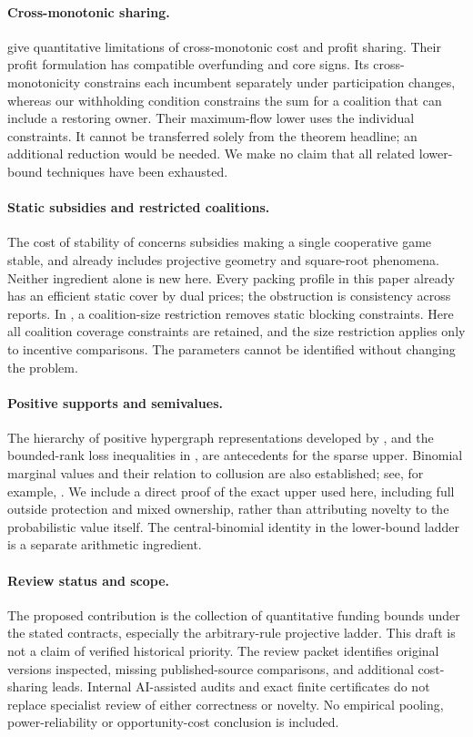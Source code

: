 \documentclass[11pt]{article}
\theoremstyle{definition}\newtheorem{definition}[theorem]{Definition}
\theoremstyle{remark}\newtheorem{remark}[theorem]{Remark}
\begin{document}
\paragraph{Cross-monotonic sharing.}
\citet{ImmorlicaEtAl2008} give quantitative limitations of cross-monotonic
cost and profit sharing. Their profit formulation has compatible overfunding
and core signs. Its cross-monotonicity constrains each incumbent separately
under participation changes, whereas our withholding condition constrains the
sum for a coalition that can include a restoring owner. Their maximum-flow
lower uses the individual constraints. It cannot be transferred solely from
the theorem headline; an additional reduction would be needed. We make no
claim that all related lower-bound techniques have been exhausted.

\paragraph{Static subsidies and restricted coalitions.}
The cost of stability of \citet{BachrachEtAl2009} concerns subsidies making a
single cooperative game stable, and already includes projective geometry and
square-root phenomena. Neither ingredient alone is new here. Every packing
profile in this paper already has an efficient static cover by dual prices;
the obstruction is consistency across reports.
In \citet{MeirEtAl2011}, a coalition-size restriction removes static blocking
constraints. Here all coalition coverage constraints are retained, and the
size restriction applies only to incentive comparisons. The parameters cannot
be identified without changing the problem.

\paragraph{Positive supports and semivalues.}
The hierarchy of positive hypergraph representations developed by
\citet{FeigeEtAl2014}, and the bounded-rank loss inequalities in
\citet{EzraEtAl2018}, are antecedents for the sparse upper.
Binomial marginal values and their relation to collusion are also established;
see, for example, \citet{Casajus2011}. We include a direct proof of the exact
upper used here, including full outside protection and mixed ownership, rather
than attributing novelty to the probabilistic value itself. The central-binomial
identity in the lower-bound ladder is a separate arithmetic ingredient.

\paragraph{Review status and scope.}
The proposed contribution is the collection of quantitative funding bounds
under the stated contracts, especially the arbitrary-rule projective ladder.
This draft is not a claim of verified historical priority. The review packet
identifies original versions inspected, missing published-source comparisons,
and additional cost-sharing leads. Internal AI-assisted audits and exact
finite certificates do not replace specialist review of either correctness or
novelty. No empirical pooling, power-reliability or opportunity-cost conclusion
is included.
\end{document}
